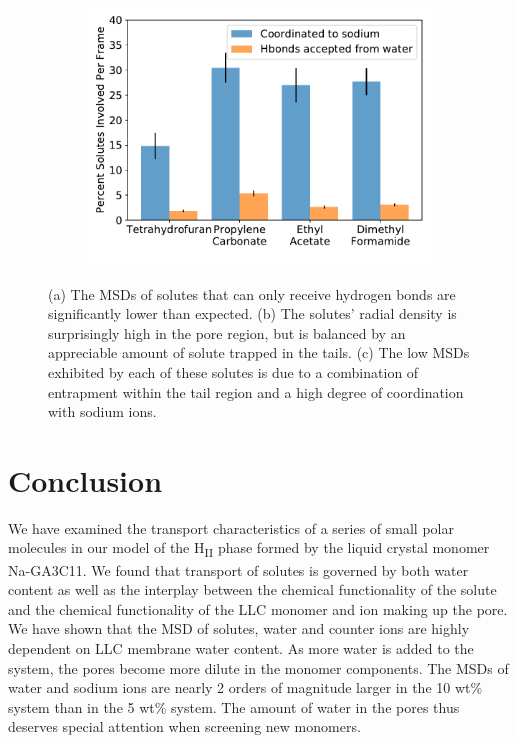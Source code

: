 \documentclass[journal=jpcbfk,manuscript=article]{achemso}
\begin{document}
\begin{figure}[!htb]
\begin{subfigure}{0.325\textwidth}
  \caption{}\label{fig:nondonors_rdf}
  \end{subfigure}
  \begin{subfigure}{0.325\textwidth}
  \includegraphics[width=\textwidth]{nondonor_hbonds.pdf}
  \caption{}\label{fig:nondonors_hbonds}
  \end{subfigure}
  \caption{(a) The MSDs of solutes that can only receive hydrogen bonds are
  significantly lower than expected. (b) The solutes' radial density
  is surprisingly high in the pore region, but is balanced by an appreciable
  amount of solute trapped in the tails. (c) The low MSDs exhibited by each of these
  solutes is due to a combination of entrapment within the tail region and a high 
  degree of coordination with sodium ions.}\label{fig:nondonors}
  \end{figure}

  \section{Conclusion}

  We have examined the transport characteristics of a series of small polar
  molecules in our model of the H\textsubscript{II} phase formed by the liquid 
  crystal monomer Na-GA3C11. We found that transport of solutes is 
  governed by both water content as well as the interplay between the chemical functionality of the solute
  and the chemical functionality of the LLC monomer and ion making up the pore. 
  We 
  have shown
  that the MSD of solutes, water and counter ions are highly 
  dependent on LLC membrane water content. As more water is added to the system, 
  the pores become 
  more dilute in the monomer components.
  The MSDs of water and
  sodium ions are nearly 2 orders of magnitude larger in the 10 wt\% system 
  than in the 5 wt\% system. The amount of water in the pores 
  thus
  deserves special
  attention when screening new monomers.
  
\end{document}
